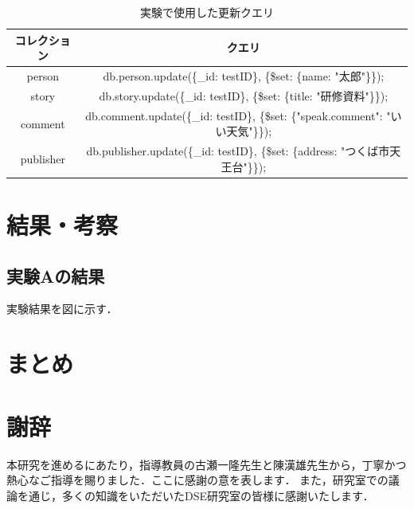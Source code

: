 \documentclass[a4paper,11pt]{ujreport}
\begin{document}
\begin{table}[htb]
  \begin{center}
    \caption{実験で使用した更新クエリ}
		\label{table:ExperimentUpdateQuery}
    \begin{tabular}{|c|c|} \hline
      コレクション & クエリ\\ \hline
      person & db.person.update(\{\_id: testID\}, \{\$set: \{name: "太郎"\}\});\\ \hline
			story & db.story.update(\{\_id: testID\}, \{\$set: \{title: "研修資料"\}\});\\ \hline
      comment & db.comment.update(\{\_id: testID\}, \{\$set: \{"speak.comment": "いい天気"\}\});\\ \hline
      publisher & db.publisher.update(\{\_id: testID\}, \{\$set: \{address: "つくば市天王台"\}\});\\ \hline
    \end{tabular}
  \end{center}
\end{table}

\chapter{結果・考察}
\label{chap:Result}
\section{実験Aの結果}
実験結果を図に示す．

\chapter{まとめ}
\label{chap:Conclusion}

\chapter*{謝辞}
本研究を進めるにあたり，指導教員の古瀬一隆先生と陳漢雄先生から，丁寧かつ熱心なご指導を賜りました．ここに感謝の意を表します．
また，研究室での議論を通じ，多くの知識をいただいたDSE研究室の皆様に感謝いたします．

\newpage

\renewcommand{\bibname}{参考文献}



\end{document}
